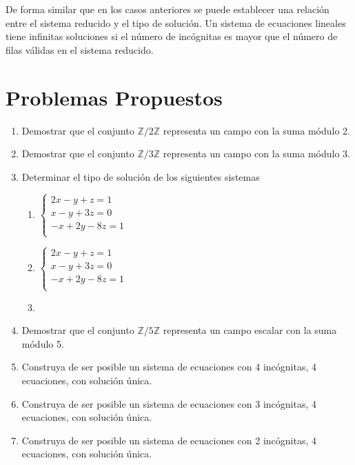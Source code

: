 De forma similar que en los casos anteriores se puede establecer una relación entre el sistema reducido y el tipo de solución. Un sistema de ecuaciones lineales tiene infinitas soluciones si el número de incógnitas es mayor que el número de filas válidas en el sistema reducido.
\newpage
\section{Problemas Propuestos}


\begin{enumerate}[1.]
\item Demostrar que el conjunto $\mathbb{Z}/2\mathbb{Z}$ representa un campo con la suma módulo 2.
\item Demostrar que el conjunto $\mathbb{Z}/3\mathbb{Z}$ representa un campo con la suma módulo 3.
\item Determinar el tipo de solución de los siguientes sistemas

\begin{enumerate}
\item $\left\lbrace \begin{aligned}
2x-y+z=1\\
x-y+3z=0\\
-x+2y-8z=1\\
\end{aligned}\right.$
\item $\left\lbrace \begin{aligned}
2x-y+z=1\\
x-y+3z=0\\
-x+2y-8z=1\\
\end{aligned}\right.$
\item {}

\end{enumerate}
\item Demostrar que el conjunto $\mathbb{Z}/5\mathbb{Z}$ representa un campo escalar con la suma módulo 5.
\item Construya de ser posible un sistema de ecuaciones con 4 incógnitas, 4 ecuaciones, con solución única.
\item Construya de ser posible un sistema de ecuaciones con 3 incógnitas, 4 ecuaciones, con solución única.
\item Construya de ser posible un sistema de ecuaciones con 2 incógnitas, 4 ecuaciones, con solución única.

\end{enumerate}
